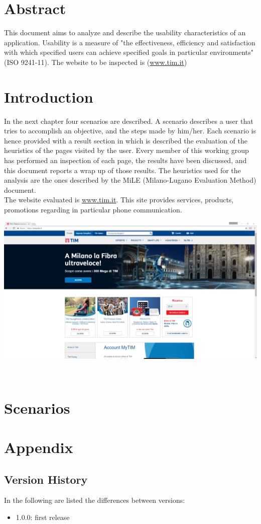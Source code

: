 \documentclass{../Common/Structure/doc_pdf}
\begin{document}
\titleToc

\chapter{Abstract}
This document aims to analyze and describe the usability characteristics of an application. Usability is a measure of "the effectiveness, efficiency and satisfaction with which specified users can achieve specified goals in particular environments" (ISO 9241-11).
The website to be inspected is (\url{www.tim.it})

\chapter{Introduction}
In the next chapter four scenarios are described. A scenario describes a user that tries to accomplish an objective, and the steps made by him/her. Each scenario is hence provided with a result section in which is described the evaluation of the heuristics of the pages visited by the user. Every member of this working group has performed an inspection of each page, the results have been discussed, and this document reports a wrap up of those results. The heuristics used for the analysis are the ones described by the MiLE (Milano-Lugano Evaluation Method) document.\\
The website evaluated is \url{www.tim.it}. This site provides services, products, promotions regarding in particular phone communication.
\vspace{1cm}
\begin{center}
	\includegraphics[width=\textwidth]{Screenshot/homepage.jpg}
\end{center}

\
\chapter{Scenarios}





\appendix
\chapter{Appendix}
\section{Version History}
In the following are listed the differences between versions:
\begin{itemize}
	\item 1.0.0: first release
\end{itemize}
\end{document}
